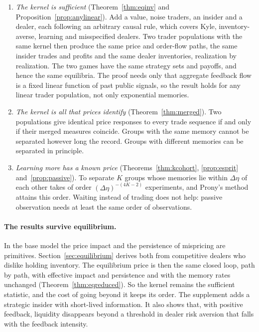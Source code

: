 \begin{enumerate}[label=(\arabic*),leftmargin=*,itemsep=2pt]
\item \emph{The kernel is sufficient} (Theorem~\ref{thm:eqinv} and Proposition~\ref{prop:anylinear}). Add a value, noise traders, an insider and a dealer, each following an arbitrary causal rule, which covers Kyle, inventory-averse, learning and misspecified dealers. Two trader populations with the same kernel then produce the same price and order-flow paths, the same insider trades and profits and the same dealer inventories, realization by realization. The two games have the same strategy sets and payoffs, and hence the same equilibria. The proof needs only that aggregate feedback flow is a fixed linear function of past public signals, so the result holds for any linear trader population, not only exponential memories.
\item \emph{The kernel is all that prices identify} (Theorem~\ref{thm:merged}). Two populations give identical price responses to every trade sequence if and only if their merged measures coincide. Groups with the same memory cannot be separated however long the record. Groups with different memories can be separated in principle.
\item \emph{Learning more has a known price} (Theorems~\ref{thm:kcohort}, \ref{prop:esprit} and~\ref{prop:passive}). To separate $K$ groups whose memories lie within $\Delta\eta$ of each other takes of order $(\Delta\eta)^{-(4K-2)}$ experiments, and Prony's method attains this order. Waiting instead of trading does not help: passive observation needs at least the same order of observations.
\end{enumerate}

\paragraph{The results survive equilibrium.} In the base model the price impact and the persistence of mispricing are primitives. Section~\ref{sec:equilibrium} derives both from competitive dealers who dislike holding inventory. The equilibrium price is then the same closed loop, path by path, with effective impact and persistence and with the memory rates unchanged (Theorem~\ref{thm:eqreduced}). So the kernel remains the sufficient statistic, and the cost of going beyond it keeps its order. The supplement adds a strategic insider with short-lived information. It also shows that, with positive feedback, liquidity disappears beyond a threshold in dealer risk aversion that falls with the feedback intensity.


